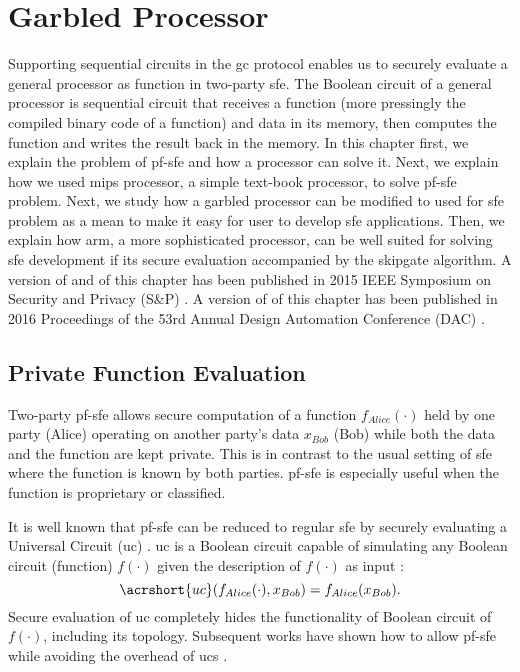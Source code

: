 \chapter{Garbled Processor}\label{chap:processor}
Supporting sequential circuits in the \acrshort{gc} protocol enables us to securely evaluate a general processor as function in two-party \acrshort{sfe}.
The Boolean circuit of a general processor is sequential circuit that receives a function (more pressingly the compiled binary code of a function) and data in its memory, then computes the function and writes the result back in the memory.
In this chapter first, we explain the problem of \acrfull{pf-sfe} and how a processor can solve it.
Next, we explain how we used \gls{mips} processor, a simple text-book processor, to solve \acrshort{pf-sfe} problem.
Next, we study how a garbled processor can be modified to used for \acrshort{sfe} problem as a mean to make it easy for user to develop \acrshort{sfe} applications.
Then, we explain how \gls{arm}, a more sophisticated processor, can be well suited for solving \acrshort{sfe} development if its secure evaluation accompanied by the \gls{skipgate} algorithm.
A version of  and  of this chapter has been published in 2015 IEEE Symposium on Security and Privacy (S\&P) \cite{songhori2015tinygarble}.
A version of  of this chapter has been published in 2016 Proceedings of the 53rd Annual Design Automation Conference (DAC) \cite{songhori2016garbledcpu}.


\section{Private Function Evaluation}\label{sec:processor-pfsfe}
Two-party \acrfull{pf-sfe} allows secure computation of a function $f_{Alice}(\cdot)$ held by one party (Alice) operating on another party's data $x_{Bob}$ (Bob) while both the data and the function are kept private.
This is in contrast to the usual setting of \acrshort{sfe} where the function is known by both parties.
\acrshort{pf-sfe} is especially useful when the function is proprietary or classified.

It is well known that \acrshort{pf-sfe} can be reduced to regular \acrshort{sfe} by securely evaluating a Universal Circuit (\acrshort{uc}) \cite{sander1999non}.
\acrshort{uc} is a Boolean circuit capable of simulating any Boolean circuit (function) $f(\cdot)$ given the description of $f(\cdot)$ as input \cite{valiant1976universal,kolesnikov2008practical}:
$$\acrshort{uc}(f_{Alice}(\cdot),x_{Bob}) = f_{Alice}(x_{Bob}).$$
Secure evaluation of \acrshort{uc} completely hides the functionality of Boolean circuit of $f(\cdot)$, including its topology.
Subsequent works have shown how to allow \acrshort{pf-sfe} while avoiding the overhead of \acrshort{uc}s \cite{katz2011constant, mohassel2013hide}.

